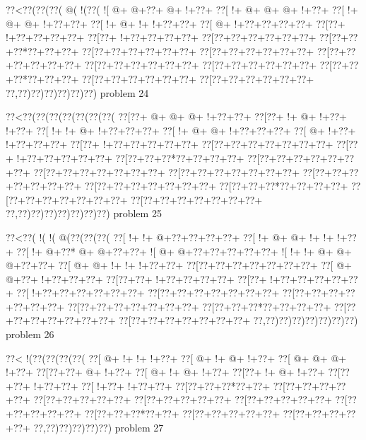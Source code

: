 \vbox{\vbox{\goo
\0??<\0??(\0??(\0??(\- @(\- !(\0??(
\- ![\- @+\- @+\0??+\- @+\- !+\0??+
\0??[\- !+\- @+\- @+\- @+\- !+\0??+
\0??[\- !+\- @+\- @+\- !+\0??+\0??+
\0??[\- !+\- @+\- !+\- !+\0??+\0??+
\0??[\- @+\- !+\0??+\0??+\0??+\0??+
\0??[\0??+\- !+\0??+\0??+\0??+\0??+
\0??[\0??+\- !+\0??+\0??+\0??+\0??+
\0??[\0??+\0??+\0??+\0??+\0??+\0??+
\0??[\0??+\0??+\0??*\0??+\0??+\0??+
\0??[\0??+\0??+\0??+\0??+\0??+\0??+
\0??[\0??+\0??+\0??+\0??+\0??+\0??+
\0??[\0??+\0??+\0??+\0??+\0??+\0??+
\0??[\0??+\0??+\0??+\0??+\0??+\0??+
\0??[\0??+\0??+\0??+\0??+\0??+\0??+
\0??[\0??+\0??+\0??*\0??+\0??+\0??+
\0??[\0??+\0??+\0??+\0??+\0??+\0??+
\0??[\0??+\0??+\0??+\0??+\0??+\0??+
\0??,\0??)\0??)\0??)\0??)\0??)\0??)
}
\hfil problem 24\hfil\break
}

\vbox{\vbox{\goo
\0??<\0??(\0??(\0??(\0??(\0??(\0??(\0??(
\0??[\0??+\- @+\- @+\- @+\- !+\0??+\0??+
\0??[\0??+\- !+\- @+\- !+\0??+\- !+\0??+
\0??[\- !+\- !+\- @+\- !+\0??+\0??+\0??+
\0??[\- !+\- @+\- @+\- !+\0??+\0??+\0??+
\0??[\- @+\- !+\0??+\- !+\0??+\0??+\0??+
\0??[\0??+\- !+\0??+\0??+\0??+\0??+\0??+
\0??[\0??+\0??+\0??+\0??+\0??+\0??+\0??+
\0??[\0??+\- !+\0??+\0??+\0??+\0??+\0??+
\0??[\0??+\0??+\0??*\0??+\0??+\0??+\0??+
\0??[\0??+\0??+\0??+\0??+\0??+\0??+\0??+
\0??[\0??+\0??+\0??+\0??+\0??+\0??+\0??+
\0??[\0??+\0??+\0??+\0??+\0??+\0??+\0??+
\0??[\0??+\0??+\0??+\0??+\0??+\0??+\0??+
\0??[\0??+\0??+\0??+\0??+\0??+\0??+\0??+
\0??[\0??+\0??+\0??*\0??+\0??+\0??+\0??+
\0??[\0??+\0??+\0??+\0??+\0??+\0??+\0??+
\0??[\0??+\0??+\0??+\0??+\0??+\0??+\0??+
\0??,\0??)\0??)\0??)\0??)\0??)\0??)\0??)
}
\hfil problem 25\hfil\break
}

\vbox{\vbox{\goo
\0??<\0??(\- !(\- !(\- @(\0??(\0??(\0??(
\0??[\- !+\- !+\- @+\0??+\0??+\0??+\0??+
\0??[\- !+\- @+\- @+\- !+\- !+\- !+\0??+
\0??[\- !+\- @+\0??*\- @+\- @+\0??+\0??+
\- ![\- @+\- @+\0??+\0??+\0??+\0??+\0??+
\- ![\- !+\- !+\- @+\- @+\- @+\0??+\0??+
\0??[\- @+\- @+\- !+\- !+\- !+\0??+\0??+
\0??[\0??+\0??+\0??+\0??+\0??+\0??+\0??+
\0??[\- @+\- @+\0??+\- !+\0??+\0??+\0??+
\0??[\0??+\0??+\- !+\0??+\0??+\0??+\0??+
\0??[\0??+\- !+\0??+\0??+\0??+\0??+\0??+
\0??[\- !+\0??+\0??+\0??+\0??+\0??+\0??+
\0??[\0??+\0??+\0??+\0??+\0??+\0??+\0??+
\0??[\0??+\0??+\0??+\0??+\0??+\0??+\0??+
\0??[\0??+\0??+\0??+\0??+\0??+\0??+\0??+
\0??[\0??+\0??+\0??*\0??+\0??+\0??+\0??+
\0??[\0??+\0??+\0??+\0??+\0??+\0??+\0??+
\0??[\0??+\0??+\0??+\0??+\0??+\0??+\0??+
\0??,\0??)\0??)\0??)\0??)\0??)\0??)\0??)
}
\hfil problem 26\hfil\break
}

\vbox{\vbox{\goo
\0??<\- !(\0??(\0??(\0??(\0??(
\0??[\- @+\- !+\- !+\- !+\0??+
\0??[\- @+\- !+\- @+\- !+\0??+
\0??[\- @+\- @+\- @+\- !+\0??+
\0??[\0??+\0??+\- @+\- !+\0??+
\0??[\- @+\- !+\- @+\- !+\0??+
\0??[\0??+\- !+\- @+\- !+\0??+
\0??[\0??+\0??+\- !+\0??+\0??+
\0??[\- !+\0??+\- !+\0??+\0??+
\0??[\0??+\0??+\0??*\0??+\0??+
\0??[\0??+\0??+\0??+\0??+\0??+
\0??[\0??+\0??+\0??+\0??+\0??+
\0??[\0??+\0??+\0??+\0??+\0??+
\0??[\0??+\0??+\0??+\0??+\0??+
\0??[\0??+\0??+\0??+\0??+\0??+
\0??[\0??+\0??+\0??*\0??+\0??+
\0??[\0??+\0??+\0??+\0??+\0??+
\0??[\0??+\0??+\0??+\0??+\0??+
\0??,\0??)\0??)\0??)\0??)\0??)
}
\hfil problem 27\hfil\break
}


